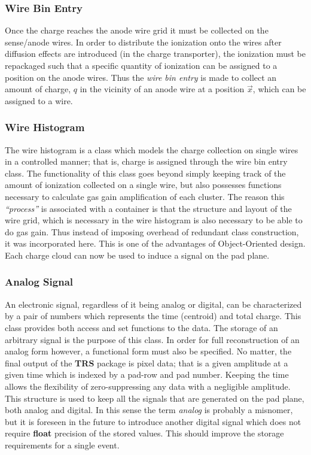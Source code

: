 \documentclass{article}
\begin{document}
\subsubsection{Wire Bin Entry}
\label{sec:wireBin}

Once the charge reaches the anode wire grid it must be collected on
the sense/anode wires.  In order to distribute the ionization onto
the wires after diffusion effects are introduced 
(in the charge transporter), the ionization must be repackaged 
such that a specific quantity of
ionization can be assigned to a position on the anode wires.  Thus the
{\em wire bin entry} is made to collect an amount of charge, $q$ in the vicinity of
an anode wire at a position $\vec{x}$, which can be assigned to a wire.

\subsubsection{Wire Histogram}
\label{sec:wireHistogram}

The wire histogram is a class which models the charge collection on single
wires in a controlled manner; that is, charge is assigned through the
wire bin entry class.  The functionality of this class goes beyond
simply keeping track of the amount of ionization collected on a single
wire, but also possesses functions necessary to calculate gas gain
amplification of each cluster.  The reason this {\em ``process''} is associated
with a container is that the structure and layout of the wire grid,
which is necessary in the wire histogram is also necessary to be
able to do gas gain.  Thus instead of imposing overhead of redundant
class construction, it was incorporated here.  This is one of the advantages
of Object-Oriented design.  Each charge cloud can now be used to
induce a signal on the pad plane.

\subsubsection{Analog Signal}
\label{sec:analogSignal}

An electronic signal, regardless of it being analog or digital,
can be characterized by a pair of numbers which represents the
time (centroid) and total charge.  This class provides both access and
set functions to the data.  The storage of an
arbitrary signal is the purpose of this class.  In order for full
reconstruction of an analog form however, a functional form must also
be specified.  No matter, the final output of the {\bf TRS} package
is pixel data; that is a given amplitude at a given time which is
indexed by a pad-row and pad number.  Keeping the time allows the
flexibility of zero-suppressing any data with a negligible amplitude.
This structure is used to keep all the signals that are generated on the
pad plane, both analog and digital.  In this sense the term {\em analog}
is probably a misnomer, but it is foreseen in the future to introduce
another digital signal which does not require {\bf float} precision of
the stored values.  This should improve the storage requirements for
a single event.  
\end{document}
